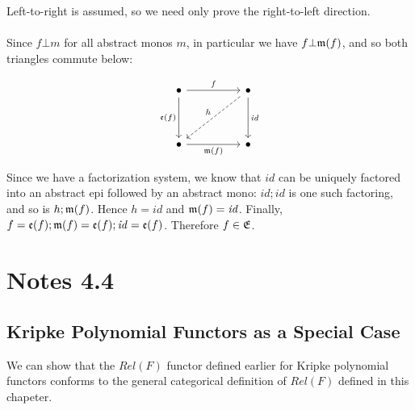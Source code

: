 \documentclass{article}
\begin{document}
Left-to-right is assumed, so we need only prove the right-to-left direction.\\~\\
Since $f \bot m$ for all abstract monos $m$, in particular we have $f \bot \frak m(f)$, and so both triangles commute below:

\[\begin{tikzcd}
	\bullet && \bullet \\
	\\
	\bullet && \bullet
	\arrow["f", from=1-1, to=1-3]
	\arrow["{\frak m(f)}"', from=3-1, to=3-3]
	\arrow["{\frak e(f)}"', from=1-1, to=3-1]
	\arrow["{\mathit{id}}", from=1-3, to=3-3]
	\arrow["h"', dashed, from=1-3, to=3-1]
\end{tikzcd}\]

Since we have a factorization system, we know that $\mathit{id}$ can be uniquely factored into an abstract epi followed by an abstract mono: $\mathit{id};\mathit{id}$ is one 
such factoring, and so is $h;\frak m(f)$. Hence $h = \mathit{id}$ and $\frak m(f) = \mathit{id}$. Finally, $f = \frak e(f);\frak m(f) = \frak e(f);\mathit{id} = \frak e(f)$. Therefore $f \in \frak E$.


\section*{Notes 4.4}

\subsection*{Kripke Polynomial Functors as a Special Case}

We can show that the $\mathit{Rel}(F)$ functor defined earlier for 
Kripke polynomial functors conforms to the general categorical
definition of $\mathit{Rel}(F)$ defined in this chapeter.
\end{document}

